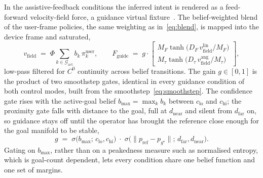 In the assistive-feedback conditions the inferred intent is rendered as a feed-forward velocity-field force, a guidance virtual fixture~\cite{rosenberg1993virtual,abbott2007haptic}. The belief-weighted blend of the user-frame policies, the same weighting as in~\eqref{eq:blend}, is mapped into the device frame and saturated,
\begin{equation}
v_{\text{field}} \;=\; \Phi\!\sum_{k \in \mathcal{G}_{\text{act}}} b_k\, \pi_k^{\text{user}},
\qquad
F_{\text{guide}} \;=\; g \cdot
\begin{bmatrix}
M_F \tanh\!\bigl(D_F\, v_{\text{field}}^{\text{lin}} / M_F\bigr)\\[2pt]
M_\tau \tanh\!\bigl(D_\tau\, v_{\text{field}}^{\text{ang}} / M_\tau\bigr)
\end{bmatrix},
\label{eq:fguide}
\end{equation}
low-pass filtered for $C^0$ continuity across belief transitions. The gain $g \in [0,1]$ is the product of two smoothstep gates, identical in every guidance condition of both control modes, built from the smoothstep~\eqref{eq:smoothstep}. The confidence gate rises with the active-goal belief $b_{\max} = \max_k b_k$ between $c_{\text{lo}}$ and $c_{\text{hi}}$; the proximity gate falls with distance to the goal, full at $d_{\text{near}}$ and silent from $d_{\text{far}}$ on, so guidance stays off until the operator has brought the reference close enough for the goal manifold to be stable,
\begin{equation}
g \;=\; \sigma\!\bigl(b_{\max};\, c_{\text{lo}}, c_{\text{hi}}\bigr)\;\cdot\;\sigma\!\bigl(\|p_{\text{ref}} - p_{g^{\star}}\|;\, d_{\text{far}}, d_{\text{near}}\bigr).
\label{eq:guidegate}
\end{equation}
Gating on $b_{\max}$, rather than on a peakedness measure such as normalised entropy, which is goal-count dependent, lets every condition share one belief function and one set of margins.

